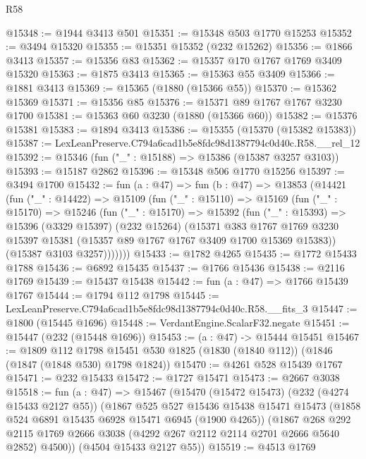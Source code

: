 \begin{lexlean}{R58}
\begin{coremodule}
@15348 := @1944 @3413 @501
@15351 := @15348 @503 @1770 @15253
@15352 := @3494 @15320
@15355 := @15351 @15352 (@232 @15262)
@15356 := @1866 @3413
@15357 := @15356 @83
@15362 := @15357 @170 @1767 @1769 @3409 @15320
@15363 := @1875 @3413
@15365 := @15363 @55 @3409
@15366 := @1881 @3413
@15369 := @15365 (@1880 (@15366 @55))
@15370 := @15362 @15369
@15371 := @15356 @85
@15376 := @15371 @89 @1767 @1767 @3230 @1700
@15381 := @15363 @60 @3230 (@1880 (@15366 @60))
@15382 := @15376 @15381
@15383 := @1894 @3413
@15386 := @15355 (@15370 (@15382 @15383))
@15387 := LexLeanPreserve.C794a6cad1b5e8fdc98d1387794c0d40c.R58.__rel_12
@15392 := @15346 (fun ("_" : @15188) => @15386 (@15387 @3257 @3103))
@15393 := @15187 @2862
@15396 := @15348 @506 @1770 @15256
@15397 := @3494 @1700
@15432 := fun (a : @47) =>
  fun (b : @47) =>
  @13853
    (@14421
      (fun ("_" : @14422) =>
      @15109
        (fun ("_" : @15110) =>
        @15169
          (fun ("_" : @15170) =>
          @15246
            (fun ("_" : @15170) =>
            @15392
              (fun ("_" : @15393) =>
              @15396
                (@3329 @15397)
                (@232 @15264)
                (@15371
                  @383
                  @1767
                  @1769
                  @3230
                  @15397
                  @15381
                  (@15357 @89 @1767 @1767 @3409 @1700 @15369 @15383))
                (@15387 @3103 @3257)))))))
@15433 := @1782 @4265
@15435 := @1772 @15433 @1788
@15436 := @6892 @15435
@15437 := @1766 @15436
@15438 := @2116 @1769
@15439 := @15437 @15438
@15442 := fun (a : @47) => @1766 @15439 @1767
@15444 := @1794 @112 @1798
@15445 := LexLeanPreserve.C794a6cad1b5e8fdc98d1387794c0d40c.R58.__fits_3
@15447 := @1800 (@15445 @1696)
@15448 := VerdantEngine.ScalarF32.negate
@15451 := @15447 (@232 (@15448 @1696))
@15453 := (a : @47) -> @15444 @15451
@15467 := @1809
    @112
    @1798
    @15451
    @530
    @1825
    (@1830 (@1840 @112))
    (@1846 (@1847 (@1848 @530) @1798 @1824))
@15470 := @4261 @528 @15439 @1767
@15471 := @232 @15433
@15472 := @1727 @15471
@15473 := @2667 @3038
@15518 := fun (a : @47) =>
  @15467
    (@15470
      (@15472 @15473)
      (@232 (@4274 @15433 @2127 @55))
      (@1867
        @525
        @527
        @15436
        @15438
        @15471
        @15473
        (@1858 @524 @6891 @15435 @6928 @15471 @6945 (@1900 @4265))
        (@1867
          @268
          @292
          @2115
          @1769
          @2666
          @3038
          (@4292 @267 @2112 @2114 @2701 @2666 @5640 @2852)
          @4500))
      (@4504 @15433 @2127 @55))
@15519 := @4513 @1769

\end{coremodule}
\end{lexlean}
